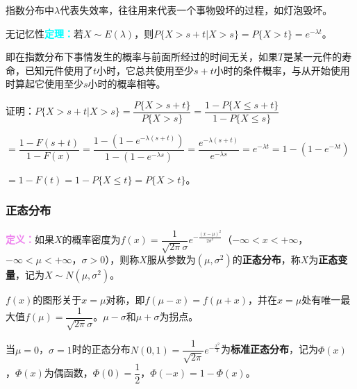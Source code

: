指数分布中$\lambda$代表失效率，往往用来代表一个事物毁坏的过程，如灯泡毁坏。

无记忆性\textcolor{aqua}{\textbf{定理：}}若$X\sim E(\lambda)$，则$P\{X>s+t|X>s\}=P\{X>t\}=e^{-\lambda t}$。

即在指数分布下事情发生的概率与前面所经过的时间无关，如果$T$是某一元件的寿命，已知元件使用了$t$小时，它总共使用至少$s+t$小时的条件概率，与从开始使用时算起它使用至少$s$小时的概率相等。

证明：$P\{X>s+t|X>s\}=\dfrac{P\{X>s+t\}}{P\{X>s\}}=\dfrac{1-P\{X\leqslant s+t\}}{1-P\{X\leqslant s\}}$

$=\dfrac{1-F(s+t)}{1-F(x)}=\dfrac{1-(1-e^{-\lambda(s+t)})}{1-(1-e^{-\lambda s})}=\dfrac{e^{-\lambda(s+t)}}{e^{-\lambda s}}=e^{-\lambda t}=1-(1-e^{-\lambda t})$

$=1-F(t)=1-P\{X\leqslant t\}=P\{X>t\}$。

\subsubsection{正态分布}

\textcolor{violet}{\textbf{定义：}}如果$X$的概率密度为$f(x)=\dfrac{1}{\sqrt{2\pi}\sigma}e^{-\frac{(x-\mu)^2}{2\sigma^2}}$（$-\infty<x<+\infty$，$-\infty<\mu<+\infty$，$\sigma>0$），则称$X$服从参数为$(\mu,\sigma^2)$的\textbf{正态分布}，称$X$为\textbf{正态变量}，记为$X\sim N(\mu,\sigma^2)$。

$f(x)$的图形关于$x=\mu$对称，即$f(\mu-x)=f(\mu+x)$，并在$x=\mu$处有唯一最大值$f(\mu)=\dfrac{1}{\sqrt{2\pi}\sigma}$。$\mu-\sigma$和$\mu+\sigma$为拐点。


当$\mu=0$，$\sigma=1$时的正态分布$N(0,1)=\dfrac{1}{\sqrt{2\pi}}e^{-\frac{x^2}{2}}$为\textbf{标准正态分布}，记为$\varPhi(x)$，$\varPhi(x)$为偶函数，$\varPhi(0)=\dfrac{1}{2}$，$\varPhi(-x)=1-\varPhi(x)$。

